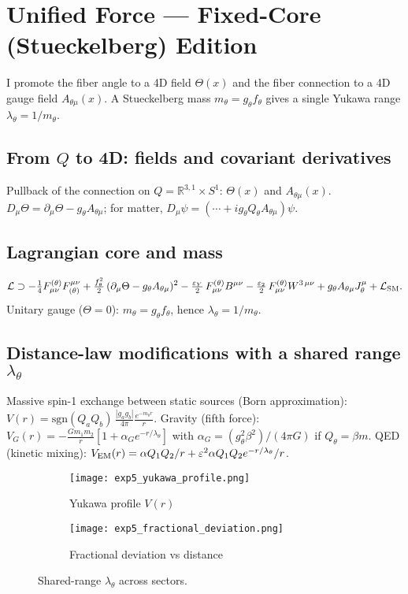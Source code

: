\section{Unified Force --- Fixed-Core (Stueckelberg) Edition}\label{sec:unified-force}
I promote the fiber angle to a 4D field $\Theta(x)$ and the fiber connection to a 4D gauge field $A_{\theta\mu}(x)$. A Stueckelberg mass $m_\theta = g_\theta f_\theta$ gives a single Yukawa range $\lambda_\theta = 1/m_\theta$.

\subsection{From \texorpdfstring{$Q$}{Q} to 4D: fields and covariant derivatives}
Pullback of the connection on $Q=\mathbb R^{3,1}\times S^1$: $\Theta(x)$ and $A_{\theta\mu}(x)$. $D_\mu\Theta = \partial_\mu\Theta - g_\theta A_{\theta\mu}$; for matter, $D_\mu\psi = (\cdots + i g_\theta Q_\theta A_{\theta\mu})\psi$.

\subsection{Lagrangian core and mass}
\begin{equation}
\mathcal{L} \supset -\tfrac14 F^{(\theta)}_{\mu\nu} F_{(\theta)}^{\mu\nu} + \tfrac{f_\theta^2}{2}\,(\partial_\mu \Theta - g_\theta A_{\theta\mu})^2 - \tfrac{\varepsilon_Y}{2}\,F^{(\theta)}_{\mu\nu} B^{\mu\nu} - \tfrac{\varepsilon_2}{2}\,F^{(\theta)}_{\mu\nu} W^{3\,\mu\nu} + g_\theta A_{\theta\mu} J_\theta^\mu + \mathcal{L}_{\rm SM}.
\end{equation}
Unitary gauge ($\Theta=0$): $m_\theta=g_\theta f_\theta$, hence $\lambda_\theta=1/m_\theta$.

\subsection{Distance-law modifications with a shared range \texorpdfstring{$\lambda_\theta$}{lambda_theta}}
Massive spin-1 exchange between static sources (Born approximation): $V(r) = \mathrm{sgn}(Q_a Q_b)\, \frac{|g_a g_b|}{4\pi} \frac{e^{-m_\theta r}}{r}$. Gravity (fifth force): $V_G(r) = -\frac{G m_1 m_2}{r}[1 + \alpha_G e^{-r/\lambda_\theta}]$ with $\alpha_G = (g_\theta^2\beta^2)/(4\pi G)$ if $Q_\theta=\beta m$. QED (kinetic mixing): $V_{\rm EM}(r) = \alpha Q_1 Q_2/r + \varepsilon^2 \alpha Q_1 Q_2 e^{-r/\lambda_\theta}/r$.

\begin{figure}[h]
  \centering
  \begin{subfigure}[b]{0.48\linewidth}
    \centering
    \texttt{[image: exp5\_yukawa\_profile.png]}
    \caption{Yukawa profile $V(r)$}
    \label{fig:yukawa-profile}
  \end{subfigure}\hfill
  \begin{subfigure}[b]{0.48\linewidth}
    \centering
    \texttt{[image: exp5\_fractional\_deviation.png]}
    \caption{Fractional deviation vs distance}
    \label{fig:yukawa-deviation}
  \end{subfigure}
  \caption{Shared-range $\lambda_\theta$ across sectors.}
  \label{fig:yukawa}
\end{figure}
